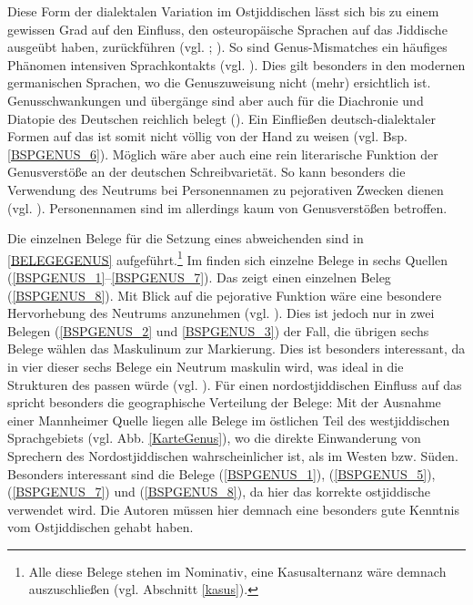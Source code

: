   Diese Form der dialektalen Variation im Ostjiddischen lässt sich bis zu einem gewissen Grad auf den Einfluss, den osteuropäische Sprachen auf das Jiddische ausgeübt haben, zurückführen (vgl. \cite{Trudgill1999}; \cite[591]{Weinreich1973}). 
So sind Genus-Mismatches ein häufiges Phänomen intensiven Sprachkontakts (vgl. \cite{Trudgill1999}). Dies gilt besonders in den modernen germanischen Sprachen, wo die Genuszuweisung nicht (mehr) ersichtlich ist. Genusschwankungen und übergänge sind aber auch für die Diachronie und Diatopie des Deutschen reichlich belegt (\cite[443f]{Schirmunski1962}). Ein Einfließen deutsch-dialektaler Formen auf das  ist somit nicht völlig von der Hand zu weisen (vgl. Bsp. \ref{BSPGENUS_6}). Möglich wäre aber auch eine rein literarische Funktion der Genusverstöße an der deutschen Schreibvarietät. So kann besonders die Verwendung des Neutrums bei Personennamen zu pejorativen Zwecken dienen (vgl. \cite{NueblingimErsch}). Personennamen sind im  allerdings kaum von Genusverstößen betroffen. 

Die einzelnen Belege für die Setzung eines abweichenden  sind in \ref{BELEGEGENUS} aufgeführt.\footnote{Alle diese Belege stehen im Nominativ, eine Kasusalternanz wäre demnach auszuschließen (vgl. Abschnitt \ref{kasus}).} Im  finden sich einzelne Belege in sechs Quellen (\ref{BSPGENUS_1}–\ref{BSPGENUS_7}). Das  zeigt einen einzelnen Beleg (\ref{BSPGENUS_8}). Mit Blick auf die pejorative Funktion wäre eine besondere Hervorhebung des Neutrums anzunehmen (vgl. \cite{NueblingimErsch}). Dies ist jedoch nur in zwei Belegen (\ref{BSPGENUS_2} und \ref{BSPGENUS_3}) der Fall, die übrigen sechs Belege wählen das Maskulinum zur Markierung. Dies ist besonders interessant, da in vier dieser sechs Belege ein Neutrum maskulin wird, was ideal in die Strukturen des  passen würde (vgl. \cite{Jacobs1990}). Für einen nordostjiddischen Einfluss auf das  spricht besonders die geographische Verteilung der Belege: Mit der Ausnahme einer Mannheimer Quelle liegen alle Belege im östlichen Teil des westjiddischen Sprachgebiets (vgl. Abb. \ref{KarteGenus}), wo die direkte Einwanderung von Sprechern des Nordostjiddischen wahrscheinlicher ist, als im Westen bzw. Süden. 
Besonders interessant sind die Belege (\ref{BSPGENUS_1}), (\ref{BSPGENUS_5}), (\ref{BSPGENUS_7}) und (\ref{BSPGENUS_8}), da hier das korrekte ostjiddische  verwendet wird. Die Autoren müssen hier demnach eine besonders gute Kenntnis vom Ostjiddischen gehabt haben.\\


